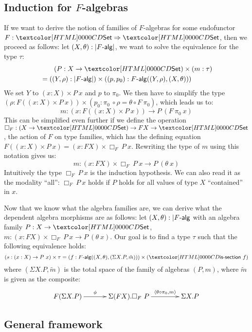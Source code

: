 \subsection{Induction for $F$-algebras}
\label{induction-for-f-algebras}
If we want to derive the notion of families of $F$-algebras for some
endofunctor $F : \Func{\Set}{\Set}$, then we proceed as follows: let
$(X,\theta) : | \algcat{F} |$, we want to solve the equivalence for
the type $\tau$:
%
\begin{align*}
&\ \ \ \ \ \ (P : X \to \Set) \times (m : \tau) \\
&= ((Y,\rho) : | \algcat{F} |) \times ((p,p_0) : \algcat{F}((Y,\rho),(X,\theta)))  
\end{align*}
%
We set $Y$ to $(x : X) \times P\ x$ and $p$ to $\pi_0$. We then have
to simplify the type
$(\rho : F ((x : X) \times P\ x)) \times (p_0 : \pi_0\ \circ \rho =
\theta \circ F\ \pi_0)$, which leads us to:
$$
m : (x : F ((x : X) \times P\ x)) \to P\ (F\ \pi_0\ x)
$$
This can be simplified even further if we define the operation
$\Box_F : (X \to \Set) \to FX \to \Set$, \ie the action of $F$ on type
families, which has the defining equation
$F ((x : X) \times P\ x) = (x : FX) \times \Box_F\ P\
x$. Rewriting the type of $m$ using this notation gives us:
$$
m : (x : FX) \times \Box_F\ P\ x \to P\ (\theta\ x)
$$
Intuitively the type $\Box_F\ P\ x$ is the induction hypothesis. We
can also read it as the modality ``all'': $\Box_F\ P\ x$ holds if $P$
holds for all values of type $X$ ``contained'' in $x$.

Now that we know what the algebra families are, we can derive what the
dependent algebra morphisms are as follows: let
$(X,\theta) : | \algcat{F}$ with an algebra family $P : X \to \Set$,
$m : (x : FX) \times \Box_F\ P\ x \to P\ (\theta\ x)$. Our goal is to
find a type $\tau$ such that the following equivalence holds:
$$
(s : (x : X) \to P\ x) \times \tau = (f : \algcat{F}((X,\theta),(\Sigma X . P , \tilde{m}))) \times (\issection\ f)
$$
where $(\Sigma X . P , \tilde{m})$ is the total space of the family of
algebras $(P,m)$, where $\tilde{m}$ is given as the composite:
$$
\xymatrix@!C{
  F (\Sigma X . P)
  \ar[r]^-{\phi}
  &\Sigma (FX) . \Box_F\ P
  \ar[r]^-{\langle \theta \circ \pi_0 , m \rangle}
  &\Sigma X . P
}
$$

\subsection{General framework}
\label{general-framework}

